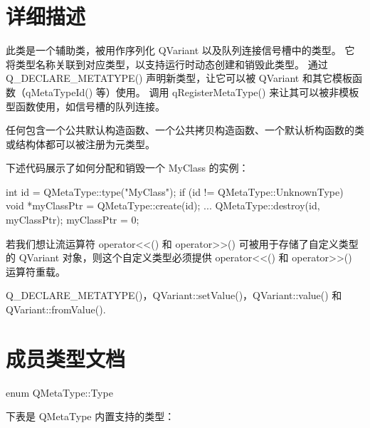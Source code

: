 \section{详细描述}

此类是一个辅助类，被用作序列化 QVariant 以及队列连接信号槽中的类型。
它将类型名称关联到对应类型，以支持运行时动态创建和销毁此类型。
通过 Q\_DECLARE\_METATYPE() 声明新类型，让它可以被 QVariant 和其它模板函数（qMetaTypeId() 等）使用。
调用 qRegisterMetaType() 来让其可以被非模板型函数使用，如信号槽的队列连接。

任何包含一个公共默认构造函数、一个公共拷贝构造函数、一个默认析构函数的类或结构体都可以被注册为元类型。

下述代码展示了如何分配和销毁一个 MyClass 的实例：

\begin{cppcode}
int id = QMetaType::type("MyClass");
if (id != QMetaType::UnknownType) {
    void *myClassPtr = QMetaType::create(id);
    ...
    QMetaType::destroy(id, myClassPtr);
    myClassPtr = 0;
}
\end{cppcode}

若我们想让流运算符 operator<<() 和 operator>>() 可被用于存储了自定义类型的 QVariant 对象，则这个自定义类型必须提供 operator<<() 和 operator>>() 运算符重载。

\begin{seeAlso}
Q\_DECLARE\_METATYPE()，QVariant::setValue()，QVariant::value() 和 QVariant::fromValue().
\end{seeAlso}

\section{成员类型文档}

enum QMetaType::Type

下表是 QMetaType 内置支持的类型：


